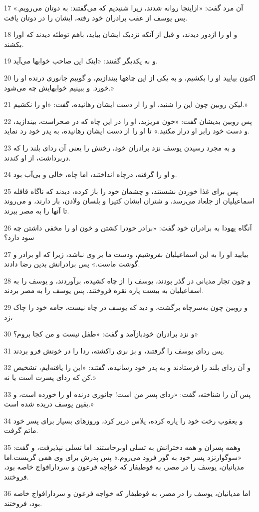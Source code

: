 \par 17 آن مرد گفت: «ازاینجا روانه شدند، زیرا شنیدیم که می‌گفتند: به دوتان می‌رویم.» پس یوسف از عقب برادران خود رفته، ایشان را در دوتان یافت.
\par 18 و او را ازدور دیدند، و قبل از آنکه نزدیک ایشان بیاید، باهم توطئه دیدند که اورا بکشند.
\par 19 و به یکدیگر گفتند: «اینک این صاحب خوابها می‌آید.
\par 20 اکنون بیایید او را بکشیم، و به یکی از این چاهها بیندازیم، و گوییم جانوری درنده او را خورد. و ببینیم خوابهایش چه می‌شود.»
\par 21 لیکن روبین چون این را شنید، او را از دست ایشان رهانیده، گفت: «او را نکشیم.»
\par 22 پس روبین بدیشان گفت: «خون مریزید، او را در این چاه که در صحراست، بیندازید، و دست خود رابر او دراز مکنید.» تا او را از دست ایشان رهانیده، به پدر خود رد نماید.
\par 23 و به مجرد رسیدن یوسف نزد برادران خود، رختش را یعنی آن ردای بلند را که دربرداشت، از او کندند.
\par 24 و او را گرفته، درچاه انداختند، اما چاه، خالی و بی‌آب بود.
\par 25 پس برای غذا خوردن نشستند، و چشمان خود را باز کرده، دیدند که ناگاه قافله اسماعیلیان از جلعاد می‌رسد، و شتران ایشان کتیرا و بلسان ولادن، بار دارند، و می‌روند تا آنها را به مصر ببرند.
\par 26 آنگاه یهودا به برادران خود گفت: «برادر خودرا کشتن و خون او را مخفی داشتن چه سود دارد؟
\par 27 بیایید او را به این اسماعیلیان بفروشیم، ودست ما بر وی نباشد، زیرا که او برادر و گوشت ماست.» پس برادرانش بدین رضا دادند.
\par 28 و چون تجار مدیانی در گذر بودند، یوسف را از چاه کشیده، برآوردند، و یوسف را به اسماعیلیان به بیست پاره نقره فروختند. پس یوسف را به مصر بردند.
\par 29 و روبین چون به‌سرچاه برگشت، و دید که یوسف در چاه نیست، جامه خود را چاک زد،
\par 30 و نزد برادران خودبازآمد و گفت: «طفل نیست و من کجا بروم؟»
\par 31 پس ردای یوسف را گرفتند، و بز نری راکشته، ردا را در خونش فرو بردند.
\par 32 و آن ردای بلند را فرستادند و به پدر خود رسانیده، گفتند: «این را یافته‌ایم، تشخیص کن که ردای پسرت است یا نه.»
\par 33 پس آن را شناخته، گفت: «ردای پسر من است! جانوری درنده او را خورده است، و یقین یوسف دریده شده است.»
\par 34 و یعقوب رخت خود را پاره کرده، پلاس دربر کرد، وروزهای بسیار برای پسر خود ماتم گرفت.
\par 35 وهمه پسران و همه دخترانش به تسلی اوبرخاستند. اما تسلی نپذیرفت، و گفت: «سوگوارنزد پسر خود به گور فرود می‌روم.» پس پدرش برای وی همی گریست.اما مدیانیان، یوسف را در مصر، به فوطیفار که خواجه فرعون و سردارافواج خاصه بود، فروختند.
\par 36 اما مدیانیان، یوسف را در مصر، به فوطیفار که خواجه فرعون و سردارافواج خاصه بود، فروختند.
 
